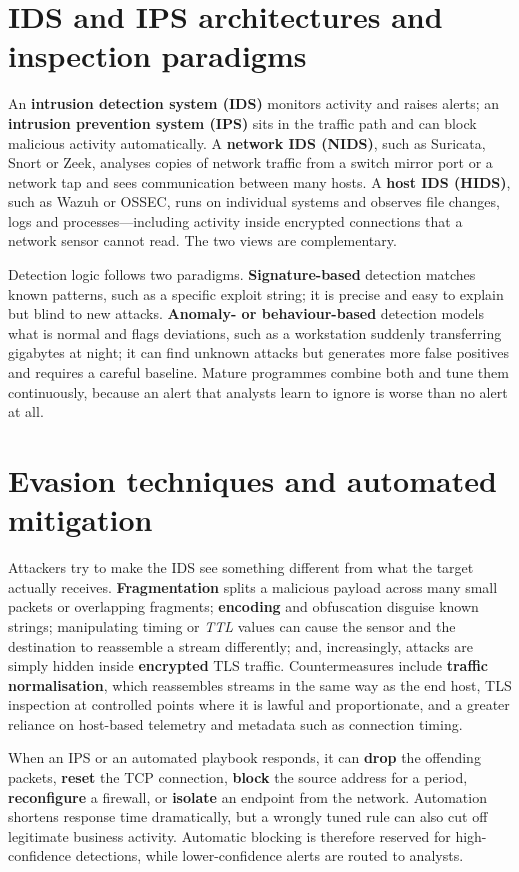 \section{IDS and IPS architectures and inspection paradigms}\label{sec:11.1}
An \textbf{intrusion detection system (IDS)} monitors activity and raises alerts; an \textbf{intrusion prevention system (IPS)} sits in the traffic path and can block malicious activity automatically. A \textbf{network IDS (NIDS)}, such as Suricata, Snort or Zeek, analyses copies of network traffic from a switch mirror port or a network tap and sees communication between many hosts. A \textbf{host IDS (HIDS)}, such as Wazuh or OSSEC, runs on individual systems and observes file changes, logs and processes—including activity inside encrypted connections that a network sensor cannot read. The two views are complementary.

Detection logic follows two paradigms. \textbf{Signature-based} detection matches known patterns, such as a specific exploit string; it is precise and easy to explain but blind to new attacks. \textbf{Anomaly- or behaviour-based} detection models what is normal and flags deviations, such as a workstation suddenly transferring gigabytes at night; it can find unknown attacks but generates more false positives and requires a careful baseline. Mature programmes combine both and tune them continuously, because an alert that analysts learn to ignore is worse than no alert at all.

\section{Evasion techniques and automated mitigation}\label{sec:11.2}
Attackers try to make the IDS see something different from what the target actually receives. \textbf{Fragmentation} splits a malicious payload across many small packets or overlapping fragments; \textbf{encoding} and obfuscation disguise known strings; manipulating timing or \emph{TTL} values can cause the sensor and the destination to reassemble a stream differently; and, increasingly, attacks are simply hidden inside \textbf{encrypted} TLS traffic. Countermeasures include \textbf{traffic normalisation}, which reassembles streams in the same way as the end host, TLS inspection at controlled points where it is lawful and proportionate, and a greater reliance on host-based telemetry and metadata such as connection timing.

When an IPS or an automated playbook responds, it can \textbf{drop} the offending packets, \textbf{reset} the TCP connection, \textbf{block} the source address for a period, \textbf{reconfigure} a firewall, or \textbf{isolate} an endpoint from the network. Automation shortens response time dramatically, but a wrongly tuned rule can also cut off legitimate business activity. Automatic blocking is therefore reserved for high-confidence detections, while lower-confidence alerts are routed to analysts.

